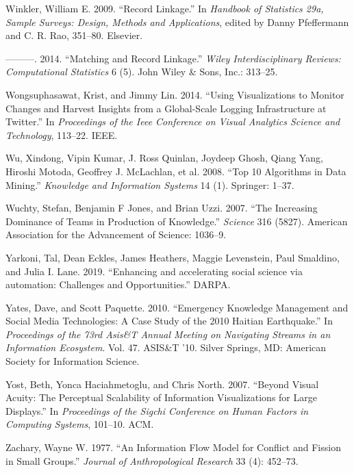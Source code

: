 \documentclass[]{krantz}
\begin{document}
\hypertarget{ref-winkler09}{}
Winkler, William E. 2009. ``Record Linkage.'' In \emph{Handbook of
Statistics 29a, Sample Surveys: Design, Methods and Applications},
edited by Danny Pfeffermann and C. R. Rao, 351--80. Elsevier.

\hypertarget{ref-WICS:WICS1317}{}
---------. 2014. ``Matching and Record Linkage.'' \emph{Wiley
Interdisciplinary Reviews: Computational Statistics} 6 (5). John Wiley
\& Sons, Inc.: 313--25.

\hypertarget{ref-wongsuphasawat2014using}{}
Wongsuphasawat, Krist, and Jimmy Lin. 2014. ``Using Visualizations to
Monitor Changes and Harvest Insights from a Global-Scale Logging
Infrastructure at Twitter.'' In \emph{Proceedings of the Ieee Conference
on Visual Analytics Science and Technology}, 113--22. IEEE.

\hypertarget{ref-wu2008top}{}
Wu, Xindong, Vipin Kumar, J. Ross Quinlan, Joydeep Ghosh, Qiang Yang,
Hiroshi Motoda, Geoffrey J. McLachlan, et al. 2008. ``Top 10 Algorithms
in Data Mining.'' \emph{Knowledge and Information Systems} 14 (1).
Springer: 1--37.

\hypertarget{ref-wuchty2007increasing}{}
Wuchty, Stefan, Benjamin F Jones, and Brian Uzzi. 2007. ``The Increasing
Dominance of Teams in Production of Knowledge.'' \emph{Science} 316
(5827). American Association for the Advancement of Science: 1036--9.

\hypertarget{ref-Yarkoni2019}{}
Yarkoni, Tal, Dean Eckles, James Heathers, Maggie Levenstein, Paul
Smaldino, and Julia I. Lane. 2019. ``Enhancing and accelerating social
science via automation: Challenges and Opportunities.'' DARPA.

\hypertarget{ref-yates-10}{}
Yates, Dave, and Scott Paquette. 2010. ``Emergency Knowledge Management
and Social Media Technologies: A Case Study of the 2010 Haitian
Earthquake.'' In \emph{Proceedings of the 73rd Asis\&T Annual Meeting on
Navigating Streams in an Information Ecosystem}. Vol. 47. ASIS\&T '10.
Silver Springs, MD: American Society for Information Science.

\hypertarget{ref-yost2007beyond}{}
Yost, Beth, Yonca Haciahmetoglu, and Chris North. 2007. ``Beyond Visual
Acuity: The Perceptual Scalability of Information Visualizations for
Large Displays.'' In \emph{Proceedings of the Sigchi Conference on Human
Factors in Computing Systems}, 101--10. ACM.

\hypertarget{ref-zachary1977}{}
Zachary, Wayne W. 1977. ``An Information Flow Model for Conflict and
Fission in Small Groups.'' \emph{Journal of Anthropological Research} 33
(4): 452--73.
\end{document}

